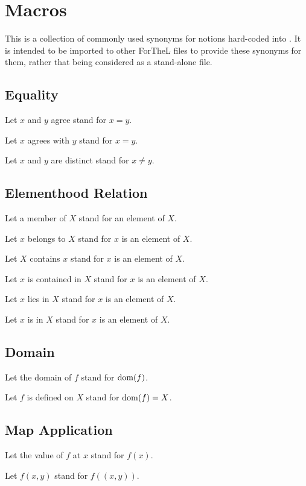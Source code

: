 \documentclass{article}
\begin{document}
\section{Macros}

This is a collection of commonly used synonyms for notions hard-coded into
\Naproche. It is intended to be imported to other ForTheL files to provide
these synonyms for them, rather that being considered as a stand-alone file.

\subsection{Equality}

\begin{forthel}
  Let $x$ and $y$ agree stand for $x = y$.

  Let $x$ agrees with $y$ stand for $x = y$.

  Let $x$ and $y$ are distinct stand for $x \neq y$.
\end{forthel}


\subsection{Elementhood Relation}

\begin{forthel}
  Let a member of $X$ stand for an element of $X$.

  Let $x$ belongs to $X$ stand for $x$ is an element of $X$.

  Let $X$ contains $x$ stand for $x$ is an element of $X$.

  Let $x$ is contained in $X$ stand for $x$ is an element of $X$.

  Let $x$ lies in $X$ stand for $x$ is an element of $X$.

  Let $x$ is in $X$ stand for $x$ is an element of $X$.
\end{forthel}


\subsection{Domain}

\begin{forthel}
  Let the domain of $f$ stand for $\operatorname{dom}(f)$.

  Let $f$ is defined on $X$ stand for $\operatorname{dom}(f) = X$.
\end{forthel}


\subsection{Map Application}

\begin{forthel}
  Let the value of $f$ at $x$ stand for $f(x)$.

  Let $f(x,y)$ stand for $f((x,y))$.
\end{forthel}
\end{document}
